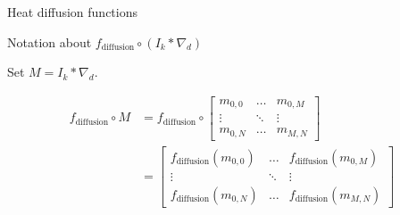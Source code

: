 \begin{frame}{Heat diffusion functions}


\end{frame}

\begin{frame}{Notation about $f_\text{diffusion} \circ (I_{k} \ast \nabla_{d})$}

Set $M = I_{k} \ast \nabla_{d}$.

\vspace{0.5cm}

\begin{align*}
f_\text{diffusion} \circ M
&= f_\text{diffusion} \circ \begin{bmatrix}
    m_{0, 0} & \dots & m_{0, M} \\
    \vdots & \ddots & \vdots \\
    m_{0, N} & \dots & m_{M, N}
\end{bmatrix} \\ 
&= \begin{bmatrix}
    f_\text{diffusion}(m_{0, 0}) & \dots & f_\text{diffusion}(m_{0, M}) \\
    \vdots & \ddots & \vdots \\
    f_\text{diffusion}(m_{0, N}) & \dots & f_\text{diffusion}(m_{M, N})
\end{bmatrix}
\end{align*}

\end{frame}


